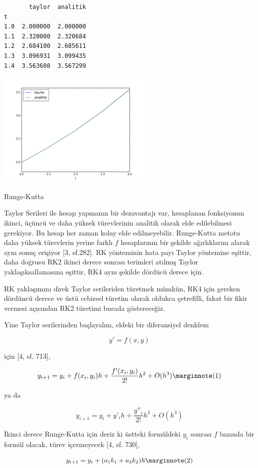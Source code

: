 \documentclass[12pt,fleqn]{article}\usepackage{../../common}
\begin{document}
\begin{verbatim}
       taylor  analitik
t                      
1.0  2.000000  2.000000
1.1  2.320000  2.320684
1.2  2.684100  2.685611
1.3  3.096931  3.099435
1.4  3.563608  3.567299
\end{verbatim}

\includegraphics[width=20em]{2_7.png}

Runge-Kutta

Taylor Serileri ile hesap yapmanın bir dezavantajı var, hesaplanan fonksiyonun
ikinci, üçüncü ve daha yüksek türevlerinin analitik olarak elde edilebilmesi
gerekiyor. Bu hesap her zaman kolay elde edilmeyebilir. Runge-Kutta metotu daha
yüksek türevlerin yerine farklı $f$ hesaplarının bir şekilde ağırlıklarını
alarak aynı sonuç erişiyor [3, sf.282]. RK yönteminin hata payı Taylor yöntemine
eşittir, daha doğrusu RK2 ikinci derece sonrası terimleri atılmış Taylor
yaklaşıksallamasına eşittir, RK4 aynı şekilde dördücü derece için.

RK yaklaşımını direk Taylor serileriden türetmek mümkün, RK4 için gereken
dördüncü derece ve üstü cebirsel türetim olarak oldukca çetrefilli, fakat bir
fikir vermesi açısından RK2 türetimi burada göstereceğiz. 

Yine Taylor serilerinden başlayalım, eldeki bir diferansiyel denklem

$$
y' = f(x,y)
$$

için [4, sf. 713],

$$
y_{i+1} = y_i + f(x_i,y_i) h + \frac{f'(x_i,y_i)}{2!} h^2 + O(h^3)
\mlabel{1}
$$

ya da

$$
y_{i+1} = y_i + y'_i h + \frac{y''_i}{2!} h^2 + O(h^3)
$$

İkinci derece Runge-Kutta için deriz ki üstteki formüldeki $y_i$ sonrası
$f$ bazında bir formül olacak, türev içermeyecek [4, sf. 730],

$$
y_{i+1} = y_i + (a_1 k_1 + a_2 k_2) h
\mlabel{2}
$$
\end{document}

